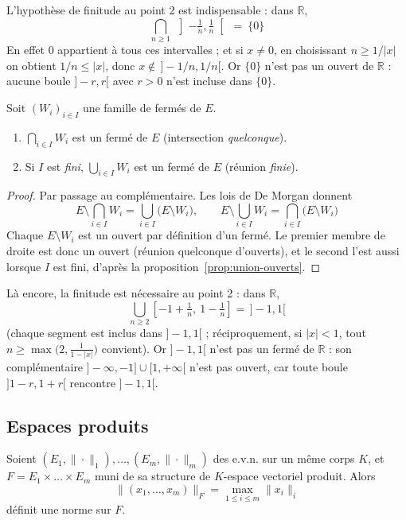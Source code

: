 \begin{remarque}
L'hypothèse de finitude au point 2 est indispensable : dans $\mathbb{R}$,
\[\bigcap_{n\geq 1}\ \left]-\tfrac{1}{n},\tfrac{1}{n}\right[ \ = \ \{0\}\]
En effet $0$ appartient à tous ces intervalles ; et si $x\neq 0$, en choisissant $n\geq 1/|x|$ on obtient $1/n\leq|x|$, donc $x\notin\,]-1/n,1/n[$. Or $\{0\}$ n'est pas un ouvert de $\mathbb{R}$ : aucune boule $]-r,r[$ avec $r>0$ n'est incluse dans $\{0\}$.
\end{remarque}

\begin{coro}
\label{coro:fermes}
Soit $(W_i)_{i\in I}$ une famille de fermés de $E$.
\begin{enumerate}
\item $\displaystyle\bigcap_{i\in I} W_i$ est un fermé de $E$ (intersection \emph{quelconque}).
\item Si $I$ est \emph{fini}, $\displaystyle\bigcup_{i\in I} W_i$ est un fermé de $E$ (réunion \emph{finie}).
\end{enumerate}
\end{coro}

\begin{proof}
Par passage au complémentaire. Les lois de De Morgan donnent
\[E\setminus\bigcap_{i\in I}W_i = \bigcup_{i\in I}\big(E\setminus W_i\big), \qquad E\setminus\bigcup_{i\in I}W_i = \bigcap_{i\in I}\big(E\setminus W_i\big)\]
Chaque $E\setminus W_i$ est un ouvert par définition d'un fermé. Le premier membre de droite est donc un ouvert (réunion quelconque d'ouverts), et le second l'est aussi lorsque $I$ est fini, d'après la proposition~\ref{prop:union-ouverts}.
\end{proof}

\begin{remarque}
Là encore, la finitude est nécessaire au point 2 : dans $\mathbb{R}$,
\[\bigcup_{n\geq 2}\left[-1+\tfrac1n,\ 1-\tfrac1n\right] = \,]-1,1[\]
(chaque segment est inclus dans $]-1,1[$ ; réciproquement, si $|x|<1$, tout $n\geq \max\big(2,\tfrac{1}{1-|x|}\big)$ convient). Or $]-1,1[$ n'est pas un fermé de $\mathbb{R}$ : son complémentaire $]-\infty,-1]\cup[1,+\infty[$ n'est pas ouvert, car toute boule $]1-r,1+r[$ rencontre $]-1,1[$.
\end{remarque}

\subsection{Espaces produits}

\begin{prop}
\label{prop:norme-produit}
Soient $(E_1,\|\cdot\|_1),\dots,(E_m,\|\cdot\|_m)$ des e.v.n. sur un même corps $K$, et $F=E_1\times\dots\times E_m$ muni de sa structure de $K$-espace vectoriel produit. Alors
\[\|(x_1,\dots,x_m)\|_F = \max_{1\leq i\leq m}\|x_i\|_i\]
définit une norme sur $F$.
\end{prop}

